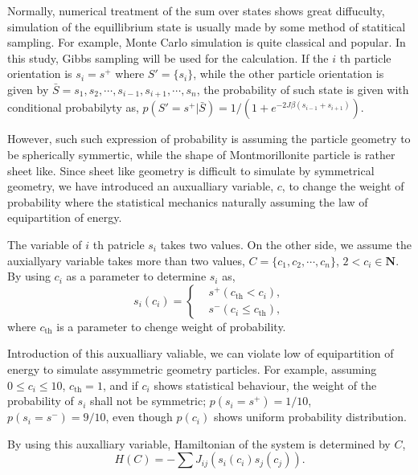 \documentclass{article}
\begin{document}
Normally, numerical treatment of the sum over states shows great diffuculty, simulation of the equillibrium state is usually made by 
some method of statitical sampling. For example, Monte Carlo simulation is quite classical and popular. 
In this study, Gibbs sampling will be used for the calculation.
If the $i$ th particle orientation is $s_i = s^+$ where $S' = \{s_i\}$, while the other particle orientation is given by
 $\bar{S} = {s_1, s_2, \cdots, s_{i-1}, s_{i+1}, \cdots, s_n}$, the probability of such state is given with conditional probabilyty as,
$p(S'=s^+|\bar{S}) = 1 / (1 + e^{-2 J\beta (s_{i-1} + s_{i+1})})$\cite{Imada_Miyashita_stats_mech}. 

However, such such expression of probability is assuming the particle geometry to be spherically symmertic, 
while the shape of Montmorillonite particle is rather sheet like. 
Since sheet like geometry is difficult to simulate by symmetrical geometry, we have introduced an auxualliary variable, $c$, to 
change the weight of probability where the statistical mechanics naturally assuming the law of equipartition of energy.

The variable of $i$ th patricle $s_i$ takes two values. On the other side, we assume the auxiallyary variable takes more than two values, 
$C = \{c_1, c_2, \cdots, c_n\}$, $2 < c_i \in \mathbf{N}$. By using $c_i$ as a parameter to determine $s_i$ as,
\begin{equation}
 s_i (c_i) = \left\{
  \begin{aligned}
   & s^+  (c_{\text{th}} < c_i), \\
   & s^-  (c_i \leq c_{\text{th}}), 
  \end{aligned}
       \right.
\end{equation}
where $c_{\text{th}}$ is a parameter to chenge weight of probability.

Introduction of this auxualliary valiable, we can violate low of equipartition of energy to simulate assymmetric geometry particles.
For example, assuming $0 \leq c_i \leq 10$, $c_{\text{th}} = 1$, and if $c_i$ shows statistical behaviour, 
the weight of the probability of $s_i$ shall not be symmetric; $p (s_i = s^+) = 1/10$, $p (s_i = s^-) = 9/10$, even though $p (c_i)$ shows uniform probability distribution.

By using this auxalliary variable, Hamiltonian of the system is determined by $C$,
\begin{equation}
 H (C) = - \sum J_{ij} (s_i(c_i)s_j(c_j)).
\end{equation}
\end{document}
